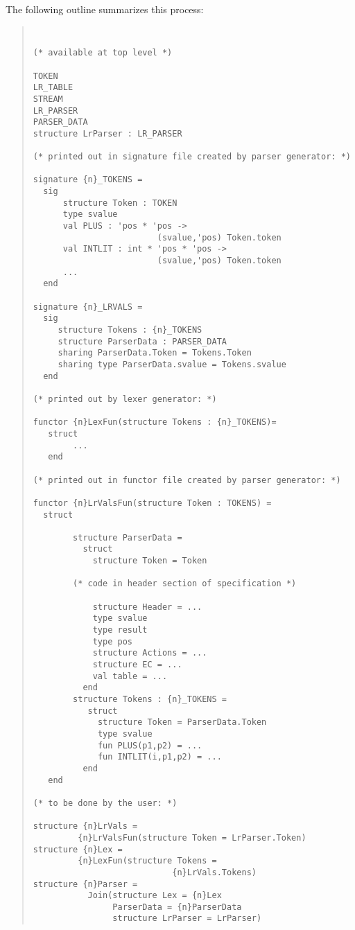 \documentclass{article}
\begin{document}
The following outline summarizes this process:
\begin{quote}
\tt
\begin{verbatim}
(* available at top level *)

TOKEN
LR_TABLE
STREAM
LR_PARSER
PARSER_DATA
structure LrParser : LR_PARSER

(* printed out in signature file created by parser generator: *)

signature {n}_TOKENS = 
  sig
      structure Token : TOKEN
      type svalue
      val PLUS : 'pos * 'pos ->
                         (svalue,'pos) Token.token
      val INTLIT : int * 'pos * 'pos ->
                         (svalue,'pos) Token.token
      ...
  end

signature {n}_LRVALS =
  sig
     structure Tokens : {n}_TOKENS
     structure ParserData : PARSER_DATA
     sharing ParserData.Token = Tokens.Token
     sharing type ParserData.svalue = Tokens.svalue
  end

(* printed out by lexer generator: *)

functor {n}LexFun(structure Tokens : {n}_TOKENS)=
   struct
        ...
   end

(* printed out in functor file created by parser generator: *)

functor {n}LrValsFun(structure Token : TOKENS) =
  struct

        structure ParserData =
          struct
            structure Token = Token

        (* code in header section of specification *)

            structure Header = ...
            type svalue
            type result
            type pos
            structure Actions = ...
            structure EC = ...
            val table = ...
          end
        structure Tokens : {n}_TOKENS =
           struct
             structure Token = ParserData.Token
             type svalue
             fun PLUS(p1,p2) = ...
             fun INTLIT(i,p1,p2) = ... 
          end
   end

(* to be done by the user: *)
 
structure {n}LrVals =
         {n}LrValsFun(structure Token = LrParser.Token)
structure {n}Lex = 
         {n}LexFun(structure Tokens =
                            {n}LrVals.Tokens)
structure {n}Parser =
           Join(structure Lex = {n}Lex
                ParserData = {n}ParserData
                structure LrParser = LrParser)
\end{verbatim}
\end{quote}
\end{document}
